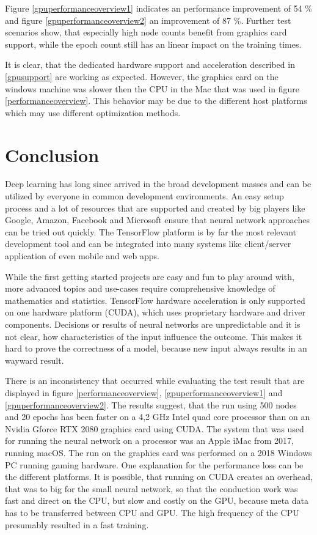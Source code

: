 \documentclass[11pt]{article}
\begin{document}
Figure \ref{gpuperformanceoverview1} indicates an performance improvement of 54 \% and figure \ref{gpuperformanceoverview2} an improvement of 87 \%.
Further test scenarios show, that especially high node counts benefit from graphics card support, while the epoch count still has an linear impact on the training times.

It is clear, that the dedicated hardware support and acceleration described in \ref{gpusupport} are working as expected.
However, the graphics card on the windows machine was slower then the CPU in the Mac that was used in figure \ref{performanceoverview}.
This behavior may be due to the different host platforms which may use different optimization methods.

\section{Conclusion}

Deep learning has long since arrived in the broad development masses and can be utilized by everyone in common development environments.
An easy setup process and a lot of resources that are supported and created by big players like Google, Amazon, Facebook and Microsoft ensure that neural network approaches can be tried out quickly.
The TensorFlow platform is by far the most relevant development tool and can be integrated into many systems like client/server application of even mobile and web apps.

While the first getting started projects are easy and fun to play around with, more advanced topics and use-cases require comprehensive knowledge of mathematics and statistics.
TensorFlow hardware acceleration is only supported on one hardware platform (CUDA), which uses proprietary hardware and driver components.
Decisions or results of neural networks are unpredictable and it is not clear, how characteristics of the input influence the outcome.
This makes it hard to prove the correctness of a model, because new input always results in an wayward result.

There is an inconsistency that occurred while evaluating the test result that are displayed in figure \ref{performanceoverview}, \ref{gpuperformanceoverview1} and \ref{gpuperformanceoverview2}.
The results suggest, that the run using 500 nodes and 20 epochs has been faster on a 4,2 GHz Intel quad core processor than on an Nvidia Gforce RTX 2080 graphics card using CUDA.
The system that was used for running the neural network on a processor was an Apple iMac from 2017, running macOS.
The run on the graphics card was performed on a 2018 Windows PC running gaming hardware.
One explanation for the performance loss can be the different platforms.
It is possible, that running on CUDA creates an overhead, that was to big for the small neural network, so that the conduction work was fast and direct on the CPU, but slow and costly on the GPU, because meta data has to be transferred between CPU and GPU.
The high frequency of the CPU presumably resulted in a fast training.
\end{document}
